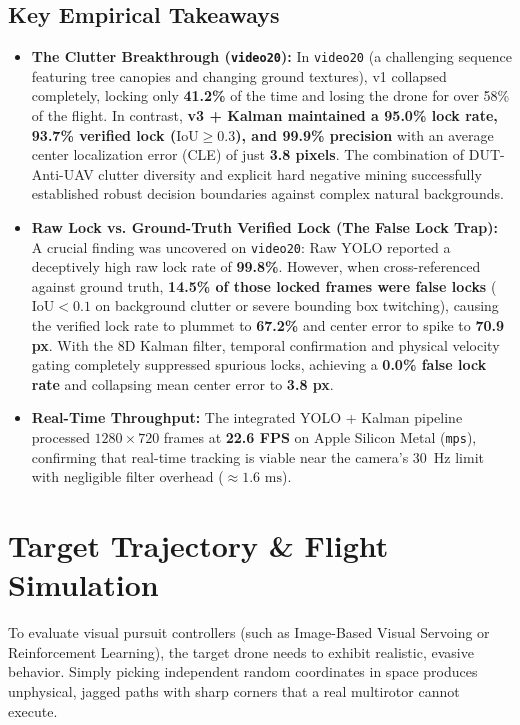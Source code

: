 \documentclass[11pt,a4paper]{article}
\begin{document}
\subsection{Key Empirical Takeaways}
\begin{itemize}[leftmargin=1.5em, itemsep=0.3em]
    \item \textbf{The Clutter Breakthrough (\texttt{video20}):} In \texttt{video20} (a challenging sequence featuring tree canopies and changing ground textures), v1 collapsed completely, locking only \textbf{41.2\%} of the time and losing the drone for over 58\% of the flight. In contrast, \textbf{v3 + Kalman maintained a 95.0\% lock rate, 93.7\% verified lock ($\text{IoU} \ge 0.3$), and 99.9\% precision} with an average center localization error (CLE) of just \textbf{3.8 pixels}. The combination of DUT-Anti-UAV clutter diversity and explicit hard negative mining successfully established robust decision boundaries against complex natural backgrounds.
    \item \textbf{Raw Lock vs. Ground-Truth Verified Lock (The False Lock Trap):} A crucial finding was uncovered on \texttt{video20}: Raw YOLO reported a deceptively high raw lock rate of \textbf{99.8\%}. However, when cross-referenced against ground truth, \textbf{14.5\% of those locked frames were false locks} ($\text{IoU} < 0.1$ on background clutter or severe bounding box twitching), causing the verified lock rate to plummet to \textbf{67.2\%} and center error to spike to \textbf{70.9 px}. With the 8D Kalman filter, temporal confirmation and physical velocity gating completely suppressed spurious locks, achieving a \textbf{0.0\% false lock rate} and collapsing mean center error to \textbf{3.8 px}.
    \item \textbf{Real-Time Throughput:} The integrated YOLO + Kalman pipeline processed $1280 \times 720$ frames at \textbf{22.6 FPS} on Apple Silicon Metal (\texttt{mps}), confirming that real-time tracking is viable near the camera's 30~Hz limit with negligible filter overhead ($\approx 1.6\text{ ms}$).
\end{itemize}

\section{Target Trajectory \& Flight Simulation}
To evaluate visual pursuit controllers (such as Image-Based Visual Servoing or Reinforcement Learning), the target drone needs to exhibit realistic, evasive behavior. Simply picking independent random coordinates in space produces unphysical, jagged paths with sharp corners that a real multirotor cannot execute.
\end{document}
